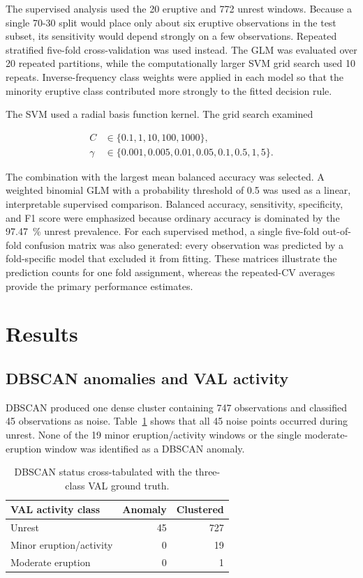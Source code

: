 \documentclass[11pt]{article}
\begin{document}
The supervised analysis used the 20 eruptive and 772 unrest windows. Because a single 70-30 split would place only about six eruptive observations in the test subset, its sensitivity would depend strongly on a few observations. Repeated stratified five-fold cross-validation was used instead. The GLM was evaluated over 20 repeated partitions, while the computationally larger SVM grid search used 10 repeats. Inverse-frequency class weights were applied in each model so that the minority eruptive class contributed more strongly to
the fitted decision rule.

The SVM used a radial basis function kernel. The grid search examined

\begin{align*}
	C &\in \{0.1,1,10,100,1000\},\\
	\gamma &\in \{0.001,0.005,0.01,0.05,0.1,0.5,1,5\}.
\end{align*}

The combination with the largest mean balanced accuracy was selected. A weighted binomial GLM with a probability threshold of 0.5 was used as a linear, interpretable supervised comparison. Balanced accuracy, sensitivity, specificity, and F1 score were emphasized because ordinary accuracy is dominated by the \SI{97.47}{\percent} unrest prevalence. For each supervised method, a single five-fold out-of-fold confusion matrix was also generated: every observation was predicted by a fold-specific model that excluded it from fitting. These matrices illustrate the prediction counts for one fold assignment, whereas the repeated-CV averages provide the primary performance estimates.

\section{Results}

\subsection{DBSCAN anomalies and VAL activity}

DBSCAN produced one dense cluster containing 747 observations and classified 45 observations as noise. Table~\ref{tab:dbscan-three} shows that all 45 noise points occurred during unrest. None of the 19 minor eruption/activity windows or the single moderate-eruption window was identified as a DBSCAN anomaly.

\begin{table}[H]
	\centering
	\caption{DBSCAN status cross-tabulated with the three-class VAL ground truth.}
	\label{tab:dbscan-three}
	\begin{tabular}{lrr}
		\toprule
		VAL activity class & Anomaly & Clustered \\
		\midrule
		Unrest & 45 & 727 \\
		Minor eruption/activity & 0 & 19 \\
		Moderate eruption & 0 & 1 \\
		\bottomrule
	\end{tabular}
\end{table}
\end{document}
